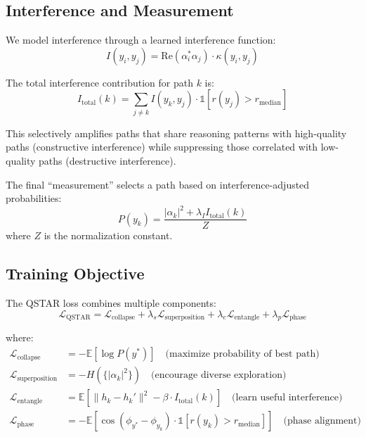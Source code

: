 \documentclass[11pt,a4paper]{article}
\newcommand{\E}{\mathbb{E}}
\newcommand{\calL}{\mathcal{L}}
\begin{document}
\subsection{Interference and Measurement}

We model interference through a learned interference function:
\begin{equation}
    I(y_i, y_j) = \text{Re}(\alpha_i^* \alpha_j) \cdot \kappa(y_i, y_j)
\end{equation}

The total interference contribution for path $k$ is:
\begin{equation}
    I_{\text{total}}(k) = \sum_{j \neq k} I(y_k, y_j) \cdot \mathbb{1}[r(y_j) > r_{\text{median}}]
\end{equation}

This selectively amplifies paths that share reasoning patterns with high-quality paths (constructive interference) while suppressing those correlated with low-quality paths (destructive interference).

The final ``measurement'' selects a path based on interference-adjusted probabilities:
\begin{equation}
    P(y_k) = \frac{|\alpha_k|^2 + \lambda_I I_{\text{total}}(k)}{Z}
\end{equation}
where $Z$ is the normalization constant.

\subsection{Training Objective}

The QSTAR loss combines multiple components:
\begin{equation}
    \calL_{\text{QSTAR}} = \calL_{\text{collapse}} + \lambda_s \calL_{\text{superposition}} + \lambda_e \calL_{\text{entangle}} + \lambda_p \calL_{\text{phase}}
\end{equation}

where:
\begin{align}
    \calL_{\text{collapse}} &= -\E\left[\log P(y^*)\right] \quad \text{(maximize probability of best path)} \\
    \calL_{\text{superposition}} &= -H(\{|\alpha_k|^2\}) \quad \text{(encourage diverse exploration)} \\
    \calL_{\text{entangle}} &= \E\left[\|h_k - h_k'\|^2 - \beta \cdot I_{\text{total}}(k)\right] \quad \text{(learn useful interference)} \\
    \calL_{\text{phase}} &= -\E\left[\cos(\phi_{y^*} - \phi_{y_k}) \cdot \mathbb{1}[r(y_k) > r_{\text{median}}]\right] \quad \text{(phase alignment)}
\end{align}
\end{document}
